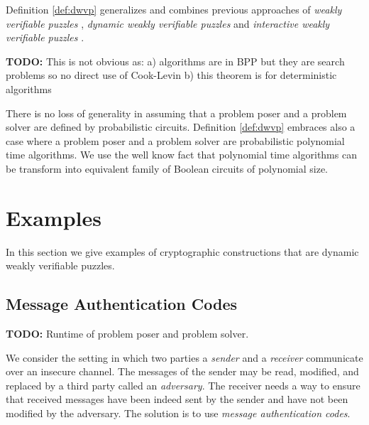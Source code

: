 \documentclass[11pt,a4paper,titlepage]{memoir}
\begin{document}
Definition \ref{def:dwvp} generalizes and combines previous approaches of
\textit{weakly verifiable puzzles} \cite{canetti2004hardness},
\textit{dynamic weakly verifiable puzzles} \cite{Dodis:2009:SAI:1530441.1530450}
and \textit{interactive weakly verifiable puzzles} \cite{DBLP:journals/corr/abs-1002-3534}.

\begin{todo}
  \textbf{TODO:}
  This is not obvious as:
  a) algorithms are in BPP but they are search problems so no direct use of Cook-Levin
  b) this theorem is for deterministic algorithms
\end{todo}

There is no loss of generality in assuming that a problem poser and a problem solver are defined by probabilistic circuits.
Definition \ref{def:dwvp} embraces also a case where a problem poser and a problem solver are probabilistic polynomial time algorithms.
We use the well know fact \cite{LectureNotesCT} that polynomial time algorithms can be transform into equivalent family of Boolean circuits of polynomial size.

\section{Examples}
\label{section:wvp_examples}
In this section we give examples of cryptographic constructions that are dynamic weakly verifiable puzzles.

\subsection{Message Authentication Codes}
\begin{todo}
  \textbf{TODO:} Runtime of problem poser and problem solver.
\end{todo}
We consider the setting in which two parties a \textit{sender} and a \textit{receiver} communicate over an insecure channel.
The messages of the sender may be read, modified, and replaced by a third party called an \textit{adversary}.
The receiver needs a way to ensure that received messages have been indeed sent by the sender and have not been modified by the adversary.
The solution is to use \textit{message authentication codes}.
\end{document}
